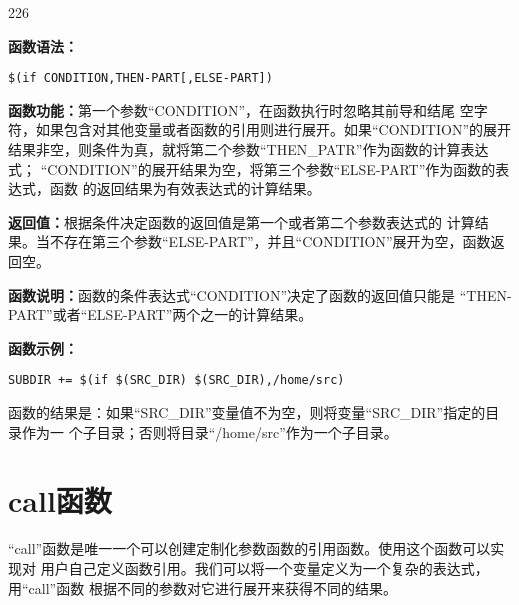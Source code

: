 \begin{dinglist}{226}
\itemsep=4pt \parskip=0pt

\item \textbf{函数语法：}

\begin{Verbatim}[]
$(if CONDITION,THEN-PART[,ELSE-PART])
\end{Verbatim}

\item \textbf{函数功能：}第一个参数“CONDITION”，在函数执行时忽略其前导和结尾
    空字符，如果包含对其他变量或者函数的引用则进行展开。如果“CONDITION”的展开
    结果非空，则条件为真，就将第二个参数“THEN\_PATR”作为函数的计算表达式；
    “CONDITION”的展开结果为空，将第三个参数“ELSE-PART”作为函数的表达式，函数
    的返回结果为有效表达式的计算结果。


\item \textbf{返回值：}根据条件决定函数的返回值是第一个或者第二个参数表达式的
    计算结果。当不存在第三个参数“ELSE-PART”，并且“CONDITION”展开为空，函数返
    回空。

\item \textbf{函数说明：}函数的条件表达式“CONDITION”决定了函数的返回值只能是
    “THEN-PART”或者“ELSE-PART”两个之一的计算结果。

\item \textbf{函数示例：}
\begin{Verbatim}[]
SUBDIR += $(if $(SRC_DIR) $(SRC_DIR),/home/src)
\end{Verbatim}

函数的结果是：如果“SRC\_DIR”变量值不为空，则将变量“SRC\_DIR”指定的目录作为一
个子目录；否则将目录“/home/src”作为一个子目录。
\end{dinglist}

\section{call函数}
“call”函数是唯一一个可以创建定制化参数函数的引用函数。使用这个函数可以实现对
用户自己定义函数引用。我们可以将一个变量定义为一个复杂的表达式，用“call”函数
根据不同的参数对它进行展开来获得不同的结果。

